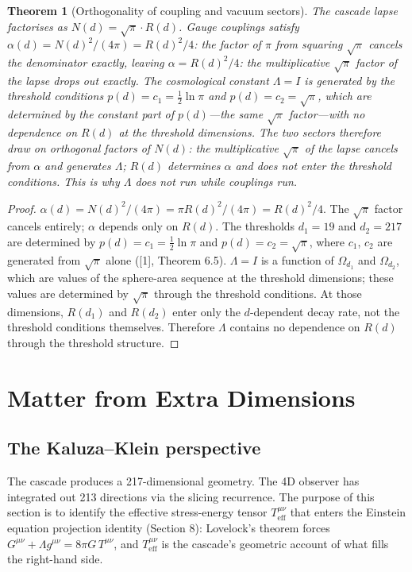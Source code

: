 \documentclass[12pt,a4paper]{article}
\newtheorem{theorem}{Theorem}[section]
\begin{document}
\begin{theorem}[Orthogonality of coupling and vacuum sectors]
The cascade lapse factorises
as $N(d) = \sqrt{\pi} \cdot R(d)$. Gauge couplings satisfy $\alpha(d) = N(d)^2/(4\pi) = R(d)^2/4$: the
factor of $\pi$ from squaring $\sqrt{\pi}$ cancels the denominator exactly, leaving $\alpha = R(d)^2/4$: the
multiplicative $\sqrt{\pi}$ factor of the lapse drops out exactly. The cosmological constant $\Lambda = I$ is
generated by the threshold conditions $p(d) = c_1 = \tfrac{1}{2}\ln\pi$ and $p(d) = c_2 = \sqrt{\pi}$, which are
determined by the constant part of $p(d)$---the same $\sqrt{\pi}$ factor---with no dependence on $R(d)$
at the threshold dimensions. The two sectors therefore draw on orthogonal factors of $N(d)$:
the multiplicative $\sqrt{\pi}$ of the lapse cancels from $\alpha$ and generates $\Lambda$; $R(d)$ determines $\alpha$ and
does not enter the threshold conditions. This is why $\Lambda$ does not run while couplings run.
\end{theorem}

\begin{proof}
$\alpha(d) = N(d)^2/(4\pi) = \pi R(d)^2/(4\pi) = R(d)^2/4$. The $\sqrt{\pi}$ factor cancels entirely;
$\alpha$ depends only on $R(d)$. The thresholds $d_1 = 19$ and $d_2 = 217$ are determined by
$p(d) = c_1 = \tfrac{1}{2}\ln\pi$ and $p(d) = c_2 = \sqrt{\pi}$, where $c_1$, $c_2$ are generated from $\sqrt{\pi}$ alone ([1],
Theorem 6.5). $\Lambda = I$ is a function of $\Omega_{d_1}$ and $\Omega_{d_2}$, which are values of the sphere-area
sequence at the threshold dimensions; these values are determined by $\sqrt{\pi}$ through the
threshold conditions. At those dimensions, $R(d_1)$ and $R(d_2)$ enter only the $d$-dependent
decay rate, not the threshold conditions themselves. Therefore $\Lambda$ contains no dependence
on $R(d)$ through the threshold structure.
\end{proof}

\section{Matter from Extra Dimensions}\label{sec:matter-from-extra-dimensions}

\subsection{The Kaluza--Klein perspective}

The cascade produces a 217-dimensional geometry. The 4D observer has integrated out
213 directions via the slicing recurrence. The purpose of this section is to identify the
effective stress-energy tensor $T^{\mu\nu}_{\text{eff}}$ that enters the Einstein equation projection identity
(Section 8): Lovelock's theorem forces $G^{\mu\nu} + \Lambda g^{\mu\nu} = 8\pi G\,T^{\mu\nu}$, and $T^{\mu\nu}_{\text{eff}}$ is the cascade's
geometric account of what fills the right-hand side.
\end{document}
